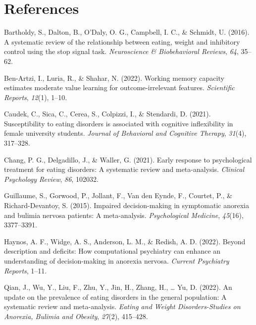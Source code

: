 \documentclass[
  man,floatsintext]{apa6}
\newlength{\cslhangindent}
\newlength{\cslentryspacingunit} %
\newenvironment{CSLReferences}[2] %
 {%
  \setlength{\parindent}{0pt}
  \ifodd #1
  \let\oldpar\par
  \def\par{\hangindent=\cslhangindent\oldpar}
  \fi
  \setlength{\parskip}{#2\cslentryspacingunit}
 }%
 {}
\begin{document}
\newpage

\hypertarget{references}{%
\section{References}\label{references}}

\hypertarget{refs}{}
\begin{CSLReferences}{1}{0}
\leavevmode{}%
Bartholdy, S., Dalton, B., O'Daly, O. G., Campbell, I. C., \& Schmidt, U. (2016). A systematic review of the relationship between eating, weight and inhibitory control using the stop signal task. \emph{Neuroscience \& Biobehavioral Reviews}, \emph{64}, 35--62.

\leavevmode{}%
Ben-Artzi, I., Luria, R., \& Shahar, N. (2022). Working memory capacity estimates moderate value learning for outcome-irrelevant features. \emph{Scientific Reports}, \emph{12}(1), 1--10.

\leavevmode{}%
Caudek, C., Sica, C., Cerea, S., Colpizzi, I., \& Stendardi, D. (2021). Susceptibility to eating disorders is associated with cognitive inflexibility in female university students. \emph{Journal of Behavioral and Cognitive Therapy}, \emph{31}(4), 317--328.

\leavevmode{}%
Chang, P. G., Delgadillo, J., \& Waller, G. (2021). Early response to psychological treatment for eating disorders: A systematic review and meta-analysis. \emph{Clinical Psychology Review}, \emph{86}, 102032.

\leavevmode{}%
Guillaume, S., Gorwood, P., Jollant, F., Van den Eynde, F., Courtet, P., \& Richard-Devantoy, S. (2015). Impaired decision-making in symptomatic anorexia and bulimia nervosa patients: A meta-analysis. \emph{Psychological Medicine}, \emph{45}(16), 3377--3391.

\leavevmode{}%
Haynos, A. F., Widge, A. S., Anderson, L. M., \& Redish, A. D. (2022). Beyond description and deficits: How computational psychiatry can enhance an understanding of decision-making in anorexia nervosa. \emph{Current Psychiatry Reports}, 1--11.

\leavevmode{}%
Qian, J., Wu, Y., Liu, F., Zhu, Y., Jin, H., Zhang, H., \ldots{} Yu, D. (2022). An update on the prevalence of eating disorders in the general population: A systematic review and meta-analysis. \emph{Eating and Weight Disorders-Studies on Anorexia, Bulimia and Obesity}, \emph{27}(2), 415--428.


\end{CSLReferences}
\end{document}

